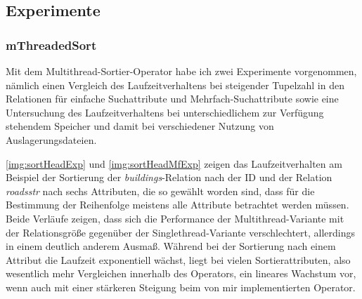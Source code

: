 \documentclass[a4paper,12pt,twoside]{article}
\newcommand{\Fb}[1]{\textit{#1}} %
\begin{document}
\subsection{Experimente}

\subsubsection{mThreadedSort}

Mit dem Multithread-Sortier-Operator habe ich zwei Experimente vorgenommen, nämlich einen Vergleich des Laufzeitverhaltens bei steigender Tupelzahl in den Relationen für einfache Suchattribute und Mehrfach-Suchattribute sowie eine Untersuchung des Laufzeitverhaltens bei unterschiedlichem zur Verfügung stehendem Speicher und damit bei verschiedener Nutzung von Auslagerungsdateien.

\autoref{img:sortHeadExp} und \autoref{img:sortHeadMfExp} zeigen das Laufzeitverhalten am Beispiel der Sortierung der \Fb{buildings}-Relation nach der ID und der Relation \Fb{roads\-str} nach sechs Attributen, die so gewählt worden sind, dass für die Bestimmung der Reihenfolge meistens alle Attribute betrachtet werden müssen. Beide Verläufe zeigen, dass sich die Performance der Multithread-Variante mit der Relationsgröße gegenüber der Singlethread-Variante verschlechtert, allerdings in einem deutlich anderem Ausmaß. Während bei der Sortierung nach einem Attribut die Laufzeit exponentiell wächst, liegt bei vielen Sortierattributen, also wesentlich mehr Vergleichen innerhalb des Operators, ein lineares Wachstum vor, wenn auch mit einer stärkeren Steigung beim von mir implementierten Operator. 
\end{document}
